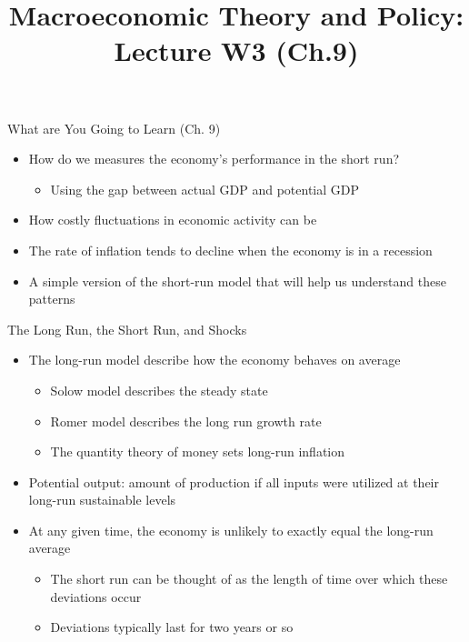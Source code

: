 \documentclass[aspectratio=1610]{beamer}
\title[Winter - Lecture 3] %
{Macroeconomic Theory and Policy: Lecture  W3 (Ch.9)}
\author[University of Toronto] %
{}
\date[] %
\begin{document}
\begin{frame}
  \titlepage
\end{frame}

\begin{frame}[wide]{What are You Going to Learn (Ch. 9)}
	\begin{itemize}
		\item How do we measures the economy’s performance in the short run? 
		\begin{itemize}
			\item Using the gap between actual GDP and potential GDP
		\end{itemize}
		\item How costly fluctuations in economic activity can be
		\item The rate of inflation tends to decline when the economy is in a recession
		\item A simple version of the short-run model that will help us understand these patterns
	\end{itemize}
\end{frame}

\begin{frame}[wide]{The Long Run, the Short Run, and Shocks}
	\begin{itemize}
		\item The long-run model describe how the economy behaves on average
			\begin{itemize}
				\item Solow model describes the steady state
				\item Romer model describes the long run growth rate
				\item The quantity theory of money sets long-run inflation
			\end{itemize}
		\item Potential output: amount of production if all inputs were utilized at their long-run sustainable levels
		\item At any given time, the economy is unlikely to exactly equal the long-run average
		\begin{itemize}
			\item The short run can be thought of as the length of time over which these deviations occur
			\item Deviations typically last for two years or so
		\end{itemize}
	\end{itemize}
\end{frame}
\end{document}
